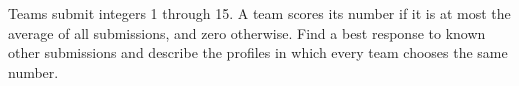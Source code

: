 Teams submit integers 1 through 15. A team scores its number if it is at most the average of all submissions, and zero otherwise. Find a best response to known other submissions and describe the profiles in which every team chooses the same number.

